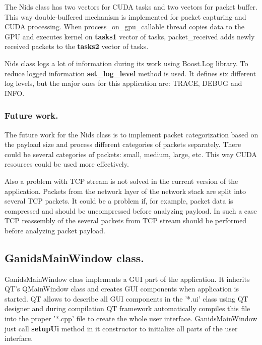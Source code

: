 \documentclass[thesis=M,english]{FITthesis}[2011/07/15]
\begin{document}
The Nids class has two vectors for CUDA tasks and two vectors for packet buffer. This way double-buffered mechanism is implemented for packet capturing and CUDA processing. When process\_on\_gpu\_callable thread copies data to the GPU and executes kernel on \textbf{tasks1} vector of tasks, packet\_received adds newly received packets to the \textbf{tasks2} vector of tasks.

Nids class logs a lot of information during its work using Boost.Log library. To reduce logged information \textbf{set\_log\_level} method is used. It defines six different log levels, but the major ones for this application are: TRACE, DEBUG and INFO.

\subsubsection*{Future work.}
The future work for the Nids class is to implement packet categorization based on the payload size and process different categories of packets separately. There could be several categories of packets: small, medium, large, etc. This way CUDA resources could be used more effectively.

Also a problem with TCP stream is not solved in the current version of the application. Packets from the network layer of the network stack are split into several TCP packets. It could be a problem if, for example, packet data is compressed and should be uncompressed before analyzing payload. In such a case TCP reassembly of the several packets from TCP stream should be performed before analyzing packet payload\cite{tcp_ref}.

\subsection{GanidsMainWindow class.}
GanidsMainWindow class implements a GUI part of the application. It inherits QT's QMainWindow class and creates GUI components when application is started. QT allows to describe all GUI components in the '*.ui' class using QT designer and during compilation QT framework automatically compiles this file into the proper '*.cpp' file to create the whole user interface. GanidsMainWindow just call \textbf{setupUi} method in it constructor to initialize all parts of the user interface.
\end{document}
